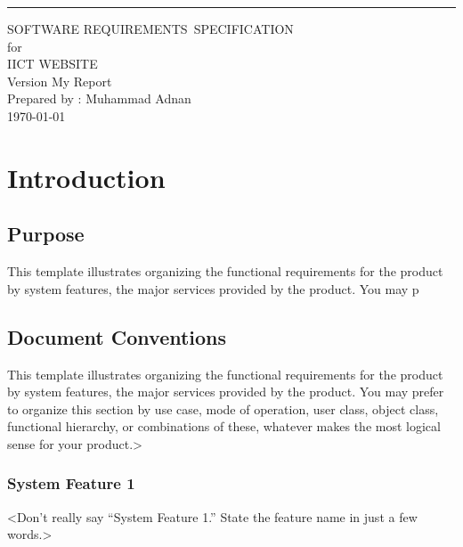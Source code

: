 \documentclass{scrreprt}
\date{}
\def\myversion{My Report}
\begin{document}
    
    \begin{flushright}
        \rule{16cm}{5pt}\vskip1cm
        \begin{bfseries}
            \Huge{SOFTWARE REQUIREMENTS\ SPECIFICATION}\
            \vspace{1.5cm} 
            \\for\\
            \vspace{1.5cm}
            IICT WEBSITE\\
            \vspace{1.5cm}
            \LARGE{Version \myversion}\\
            \vspace{1.5cm}
            Prepared by : Muhammad Adnan\\ 
            \vspace{1.5cm}
            \today\
        \end{bfseries}
    \end{flushright}
    
    
    \tableofcontents
    
    \chapter{Introduction} 
    \section{Purpose}
    This template illustrates organizing the functional requirements for the product by system features, the major services provided by the product. You may p
    \section{Document Conventions} 
    This template illustrates organizing the functional requirements for the product by system features, the major services provided by the product. You may prefer to organize this section by use case, mode of operation, user class, object class, functional hierarchy, or combinations of these, whatever makes the most logical sense for your product.>

\subsection*{System Feature 1}

<Don’t really say “System Feature 1.” State the feature name in just a few words.>
\end{document}
